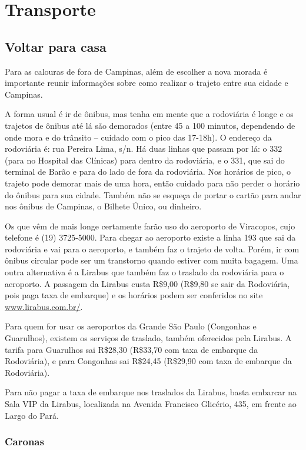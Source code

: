 
\section{Transporte}
\subsection{Voltar para casa}

Para as calouras de fora de Campinas, além de escolher a nova morada é
importante reunir informações sobre como realizar o trajeto entre sua cidade e
Campinas.

A forma usual é ir de ônibus, mas tenha em mente que a rodoviária é longe e os
trajetos de ônibus até lá são demorados (entre 45 a 100 minutos, dependendo de
onde mora e do trânsito -- cuidado com o pico das 17-18h). O endereço da
rodoviária é: rua Pereira Lima, s/n. Há duas linhas que passam por lá: o 332
(para no Hospital das Clínicas) para dentro da rodoviária, e o 331, que sai do
terminal de Barão e para do lado de fora da rodoviária. Nos horários de pico, o
trajeto pode demorar mais de uma hora, então cuidado para não perder o horário
do ônibus para sua cidade. Também não se esqueça de portar o cartão para andar
nos ônibus de Campinas, o Bilhete Único, ou dinheiro.

Os que vêm de mais longe certamente farão uso do aeroporto de Viracopos, cujo
telefone é (19) 3725-5000. Para chegar ao aeroporto existe a linha 193 que sai
da rodoviária e vai para o aeroporto, e também faz o trajeto de volta. Porém,
ir com ônibus circular pode ser um transtorno quando estiver com muita bagagem.
Uma outra alternativa é a Lirabus que também faz o traslado da rodoviária para
o aeroporto. A passagem da Lirabus custa R\$9,00 (R\$9,80 se sair da
Rodoviária, pois paga taxa de embarque) e os horários podem ser conferidos no
site \url{www.lirabus.com.br/}.

Para quem for usar os aeroportos da Grande São Paulo (Congonhas e Guarulhos),
existem os serviços de traslado, também oferecidos pela Lirabus. A tarifa para
Guarulhos sai R\$28,30 (R\$33,70 com taxa de embarque da Rodoviária), e para
Congonhas sai R\$24,45 (R\$29,90 com taxa de embarque da Rodoviária).

Para não pagar a taxa de embarque nos traslados da Lirabus, basta embarcar na
Sala VIP da Lirabus, localizada na Avenida Francisco Glicério, 435, em frente
ao Largo do Pará.

\subsubsection{Caronas}

